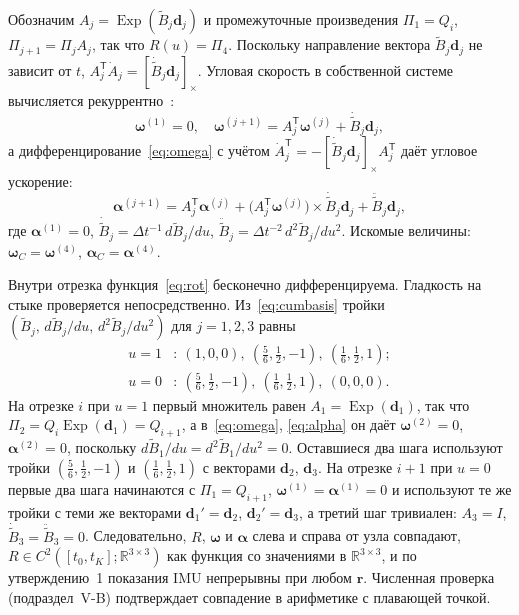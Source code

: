 \documentclass{misisarticle}
\newcommand{\Exp}{\operatorname{Exp}}
\newcommand{\cross}[1]{[#1]_{\times}}
\newcommand{\R}{\mathbb{R}}
\newcommand{\T}{^{\mathsf{T}}}
\newcommand{\vb}[1]{\mathbf{#1}}
\begin{document}
Обозначим $A_j=\Exp(\tilde B_j\vb d_j)$ и промежуточные произведения $\Pi_1=Q_i$, $\Pi_{j+1}=\Pi_jA_j$, так что $R(u)=\Pi_4$. Поскольку направление вектора $\tilde B_j\vb d_j$ не зависит от $t$, $A_j\T\dot A_j=\cross{\dot{\tilde B}_j\vb d_j}$. Угловая скорость в собственной системе вычисляется рекуррентно~\cite{sommer}:
\begin{equation}
  \boldsymbol\omega^{(1)}=0,\quad
  \boldsymbol\omega^{(j+1)}=A_j\T\boldsymbol\omega^{(j)}+\dot{\tilde B}_j\vb d_j,
  \label{eq:omega}
\end{equation}
а дифференцирование~\eqref{eq:omega} с учётом $\dot A_j\T=-\cross{\dot{\tilde B}_j\vb d_j}A_j\T$ даёт угловое ускорение:
\begin{equation}
  \boldsymbol\alpha^{(j+1)}=A_j\T\boldsymbol\alpha^{(j)}
  +\bigl(A_j\T\boldsymbol\omega^{(j)}\bigr)\times\dot{\tilde B}_j\vb d_j
  +\ddot{\tilde B}_j\vb d_j,
  \label{eq:alpha}
\end{equation}
где $\boldsymbol\alpha^{(1)}=0$, $\dot{\tilde B}_j=\Delta t^{-1}\,d\tilde B_j/du$, $\ddot{\tilde B}_j=\Delta t^{-2}\,d^2\tilde B_j/du^2$. Искомые величины: $\boldsymbol\omega_C=\boldsymbol\omega^{(4)}$, $\boldsymbol\alpha_C=\boldsymbol\alpha^{(4)}$.

Внутри отрезка функция~\eqref{eq:rot} бесконечно дифференцируема. Гладкость на стыке проверяется непосредственно. Из~\eqref{eq:cumbasis} тройки $(\tilde B_j,\,d\tilde B_j/du,\,d^2\tilde B_j/du^2)$ для $j=1,2,3$ равны
\begin{equation*}
  \begin{aligned}
    u=1&:\ (1,0,0),\ (\tfrac56,\tfrac12,-1),\ (\tfrac16,\tfrac12,1);\\
    u=0&:\ (\tfrac56,\tfrac12,-1),\ (\tfrac16,\tfrac12,1),\ (0,0,0).
  \end{aligned}
\end{equation*}
На отрезке $i$ при $u=1$ первый множитель равен $A_1=\Exp(\vb d_1)$, так что $\Pi_2=Q_i\Exp(\vb d_1)=Q_{i+1}$, а в~\eqref{eq:omega}, \eqref{eq:alpha} он даёт $\boldsymbol\omega^{(2)}=0$, $\boldsymbol\alpha^{(2)}=0$, поскольку $d\tilde B_1/du=d^2\tilde B_1/du^2=0$. Оставшиеся два шага используют тройки $(\tfrac56,\tfrac12,-1)$ и $(\tfrac16,\tfrac12,1)$ с векторами $\vb d_2$, $\vb d_3$. На отрезке $i+1$ при $u=0$ первые два шага начинаются с $\Pi_1=Q_{i+1}$, $\boldsymbol\omega^{(1)}=\boldsymbol\alpha^{(1)}=0$ и используют те же тройки с теми же векторами $\vb d_1'=\vb d_2$, $\vb d_2'=\vb d_3$, а третий шаг тривиален: $A_3=I$, $\dot{\tilde B}_3=\ddot{\tilde B}_3=0$. Следовательно, $R$, $\boldsymbol\omega$ и $\boldsymbol\alpha$ слева и справа от узла совпадают, $R\in C^2([t_0,t_K];\R^{3\times3})$ как функция со значениями в $\R^{3\times3}$, и по утверждению~1 показания IMU непрерывны при любом $\vb r$. Численная проверка (подраздел~V-B) подтверждает совпадение в арифметике с плавающей точкой.
\end{document}

